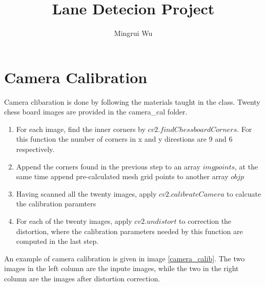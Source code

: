 \documentclass[12pt]{article}
\title{Lane Detecion Project}
\author{Mingrui Wu}
\date{}
\begin{document}
\maketitle


\section{Camera Calibration}
Camera clibaration is done by following the materials taught in the class. Twenty chess board images are provided in the camera\_cal folder. 
\begin{enumerate}
	\item For each image, find the inner corners by $cv2.findChessboardCorners$. For this function the number of corners in x and y direstions are 9 and 6 respectively.
	\item Append the corners found in the previous step to an array $imgpoints$, at the same time append pre-calculated mesh grid points to another array $objp$
	\item Having scanned all the twenty images, apply $cv2.calibrateCamera$ to calcuate the calibration paramters
	\item For each of the twenty images, apply $cv2.undistort$ to correction the distortion, where the calibration parameters needed by this function are computed in the last step.
\end{enumerate}
	 
An example of camera calibration is given in image \ref{camera_calib}. The two images in the left column are the inpute images, while the two in the right column are the images after distortion correction.
\end{document}
